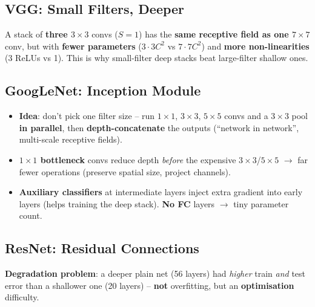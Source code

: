 \documentclass[10pt,a4paper]{article}
\begin{document}
	\subsection{VGG: Small Filters, Deeper}

	\begin{importantbox}
		A stack of \textbf{three $3{\times}3$} convs ($S{=}1$) has the \textbf{same receptive field as one $7{\times}7$} conv, but with \textbf{fewer parameters} ($3{\cdot}3C^2$ vs $7{\cdot}7C^2$) and \textbf{more non-linearities} (3 ReLUs vs 1). This is why small-filter deep stacks beat large-filter shallow ones.
	\end{importantbox}

	\subsection{GoogLeNet: Inception Module}

	\begin{itemize}[leftmargin=*]
		\item \textbf{Idea}: don't pick one filter size -- run $1{\times}1$, $3{\times}3$, $5{\times}5$ convs and a $3{\times}3$ pool \textbf{in parallel}, then \textbf{depth-concatenate} the outputs (``network in network'', multi-scale receptive fields).
		\item \textbf{$1{\times}1$ bottleneck} convs reduce depth \emph{before} the expensive $3{\times}3$/$5{\times}5$ $\rightarrow$ far fewer operations (preserve spatial size, project channels).
		\item \textbf{Auxiliary classifiers} at intermediate layers inject extra gradient into early layers (helps training the deep stack). \textbf{No FC} layers $\rightarrow$ tiny parameter count.
	\end{itemize}

	\subsection{ResNet: Residual Connections}

	\begin{importantbox}
		\textbf{Degradation problem}: a deeper plain net (56 layers) had \emph{higher} train \emph{and} test error than a shallower one (20 layers) -- \textbf{not} overfitting, but an \textbf{optimisation} difficulty.
	\end{importantbox}
\end{document}
